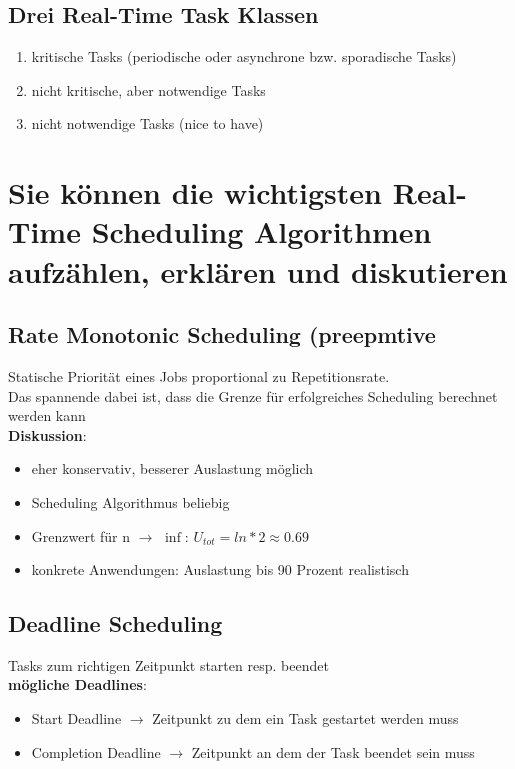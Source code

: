 \documentclass{report}
\theoremstyle{definition}
\theoremstyle{example}
\begin{document}
	\subsection{Drei Real-Time Task Klassen}
\begin{enumerate}
	\item kritische Tasks (periodische oder asynchrone bzw. sporadische Tasks)
	\item nicht kritische, aber notwendige Tasks
	\item nicht notwendige Tasks (nice to have)
\end{enumerate}


\section{Sie können die wichtigsten Real-Time Scheduling Algorithmen aufzählen, erklären und diskutieren}

	\subsection{Rate Monotonic Scheduling (preepmtive}
Statische Priorität eines Jobs proportional zu Repetitionsrate.\\
Das spannende dabei ist, dass die Grenze für erfolgreiches Scheduling berechnet werden kann \\
\textbf{Diskussion}:
\begin{itemize}
	\item eher konservativ, besserer Auslastung möglich
	\item Scheduling Algorithmus beliebig
	\item Grenzwert für n $\rightarrow$ $\inf$: $U_{tot} = ln * 2 \approx 0.69$
	\item konkrete Anwendungen: Auslastung bis 90 Prozent realistisch
\end{itemize}

	\subsection{Deadline Scheduling}
Tasks zum richtigen Zeitpunkt starten resp. beendet\\
\textbf{mögliche Deadlines}:
\begin{itemize}
	\item Start Deadline $\rightarrow$ Zeitpunkt zu dem ein Task gestartet werden muss
	\item Completion Deadline $\rightarrow$ Zeitpunkt an dem der Task beendet sein muss
\end{itemize}
\end{document}
